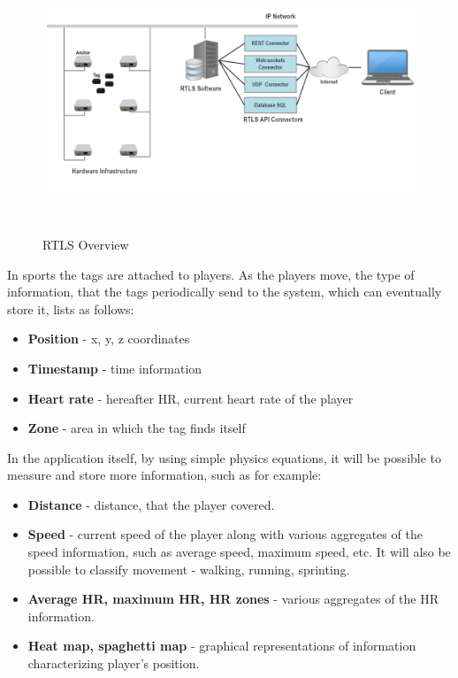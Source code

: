 \begin{figure}[htb]
\begin{center}
  \includegraphics*[width=14cm,height=8cm,keepaspectratio]{images/rtls}
\end{center}
\caption{RTLS Overview}
\label{img:rtls}
\end{figure}

In sports the tags are attached to players. As the players move, the type of information, that the tags periodically send to the system, which can eventually store it, lists as follows:
\begin{itemize}
\item \textbf{Position} - x, y, z coordinates
\item \textbf{Timestamp} - time information
\item \textbf{Heart rate} - hereafter HR, current heart rate of the player
\item \textbf{Zone} - area in which the tag finds itself
\end{itemize}

In the application itself, by using simple physics equations, it will be possible to measure and store more information, such as for example:
\begin{itemize}
\item \textbf{Distance} - distance, that the player covered.
\item \textbf{Speed} - current speed of the player along with various aggregates of the speed information, such as average speed, maximum speed, etc. It will also be possible to classify movement - walking, running, sprinting.
\item \textbf{Average HR, maximum HR, HR zones} - various aggregates of the HR information.
\item \textbf{Heat map, spaghetti map} - graphical representations of information characterizing player’s position.
\end{itemize}

